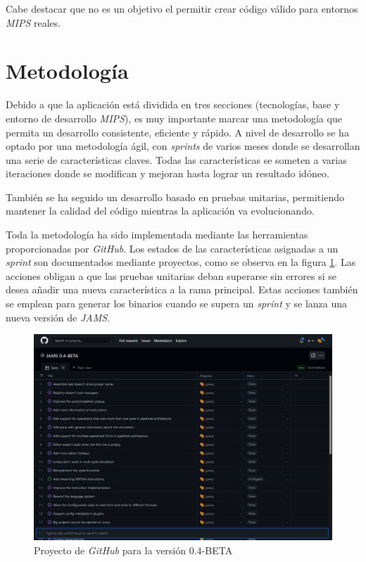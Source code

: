 Cabe destacar que no es un objetivo el permitir crear código válido para
entornos \textit{MIPS} reales.


\section{Metodología}\label{sec:metodologia}

Debido a que la aplicación está dividida en tres secciones (tecnologías, base y entorno de desarrollo \textit{MIPS}),
es muy importante marcar una metodología que permita un desarrollo consistente, eficiente y rápido.
A nivel de desarrollo se ha optado por una metodología ágil, con \textit{sprints} de varios meses
donde se desarrollan una serie de características claves.
Todas las características se someten a varias iteraciones donde se modifican y mejoran hasta lograr un
resultado idóneo.

También se ha seguido un desarrollo basado en pruebas unitarias,
permitiendo mantener la calidad del código mientras la aplicación va evolucionando.

Toda la metodología ha sido implementada mediante las herramientas proporcionadas por \textit{GitHub}.
Los estados de las características asignadas a un \textit{sprint} son documentados mediante proyectos,
como se observa en la figura \ref{fig:introduccion-github}.
Las acciones obligan a que las pruebas unitarias deban superarse sin errores si se desea añadir una nueva
característica a la rama principal.
Estas acciones también se emplean para generar los binarios cuando se supera un \textit{sprint}
y se lanza una nueva versión de \textit{JAMS}.

\begin{figure}[H]
    \centering
    \includegraphics[width=\textwidth]{images/introduction/github}
    \caption{Proyecto de \textit{GitHub} para la versión 0.4-BETA}
    \label{fig:introduccion-github}
\end{figure}
